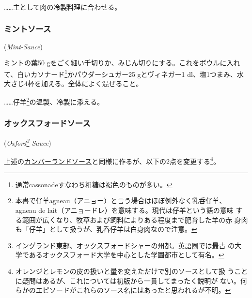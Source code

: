 \begin{recette}
\ldots{}\ldots{}主として肉の冷製料理に合わせる。

\maeaki

\hypertarget{mint-sauce}{%
\subsubsection{ミントソース}\label{mint-sauce}}

\hspace{1em}(\emph{Mint-Sauce})


ミントの葉50
gをごく細い千切りか、みじん切りにする。これをボウルに入れて、白いカソナード\footnote{通常cassonadeすなわち粗糖は褐色のものが多い。}かパウダーシュガー25
gとヴィネガー1\undemi{}
dl、塩1つまみ、水大さじ4杯を加える。全体によく混ぜること。

\ldots{}\ldots{}仔羊\footnote{本書で仔羊agneau（アニョー）と言う場合はほぼ例外なく乳呑仔羊、
  agneau de lait（アニョードレ）を意味する。現代は仔羊という語の意味
  する範囲が広くなり、牧草および飼料によりある程度まで肥育した羊の赤
  身肉も「仔羊」として扱うが、乳呑仔羊は白身肉なので注意。}の温製、冷製に添える。

\maeaki

\hypertarget{oxford-sauce}{%
\subsubsection{オックスフォードソース}\label{oxford-sauce}}

\hspace{1em}(\emph{Oxford\footnote{イングランド東部、オックスフォードシャーの州都。英語圏では最古
  の大学であるオックスフォード大学を中心とした学園都市として有名。}
Sauce})

上述の\protect\hyperlink{cumberland-sauce}{カンバーランドソース}と同様に作るが、以下の2点を変更する\footnote{オレンジとレモンの皮の扱いと量を変えただけで別のソースとして扱
  うことに疑問はあるが、これについては初版から一貫してまったく説明が
  ない。何らかのエピソードがこれらのソース名にはあったと思われるが不明。}。


\end{recette}
